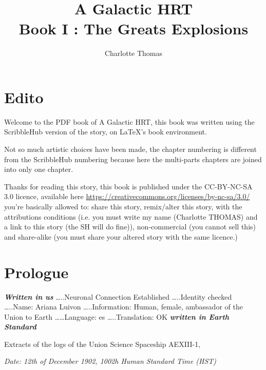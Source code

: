 \documentclass[hidelinks,12pt,a4paper]{book}
\title{A Galactic HRT \\ Book I : The Greats Explosions}
\author{Charlotte Thomas}
\begin{document}
    \maketitle
    \tableofcontents
    
    \chapter*{Edito}
    Welcome to the PDF book of A Galactic HRT, this book was written using the ScribbleHub version of the story, on \LaTeX's book 
    environment.\par 
    \bigskip
    Not so much artistic choices have been made, the chapter numbering is different from the ScribbleHub numbering 
    because here the multi-parts chapters are joined into only one chapter.
    \par
    \bigskip 
    Thanks for reading this story, this book is published under the CC-BY-NC-SA 3.0 licence, available here 
    \url{https://creativecommons.org/licenses/by-nc-sa/3.0/}
    you're basically allowed to: share this story, remix/alter this story, with the attributions conditions (i.e. you must 
    write my name (Charlotte THOMAS) and a link to this story (the SH will do fine)), non-commercial (you cannot 
    sell this) and share-alike (you must share your altered story with the same licence.)



    \chapter*{Prologue}
    \textit{\textbf{Written in \gls{us}}}\newline
    …..Neuronal Connection Established\newline
    …..Identity checked\newline
    …..Name: Ariana Luivon\newline
    …..Information: Human, female, ambassador of the Union to Earth\newline
    ……Language: \gls{es}\newline
    …..Translation: OK\newline
    \textit{\textbf{written in Earth Standard}}\par
    \bigskip

Extracts of the logs of the Union Science Spaceship AEXIII-1,\par
\textit{Date: 12th of December 1902, 1002h Human Standard Time (HST)}\newline
\end{document}
